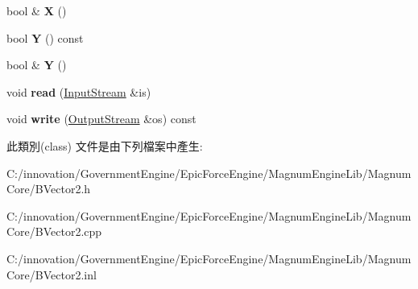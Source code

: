 \begin{DoxyCompactItemize}
\item 
bool \& {\bfseries X} ()\hypertarget{class_i_dream_sky_1_1_b_vector2_aa8c60f47da18379ac304c7e4e9345c1b}{}\label{class_i_dream_sky_1_1_b_vector2_aa8c60f47da18379ac304c7e4e9345c1b}

\item 
bool {\bfseries Y} () const \hypertarget{class_i_dream_sky_1_1_b_vector2_a7cdcf6dcce51f5551c194712821c5e0b}{}\label{class_i_dream_sky_1_1_b_vector2_a7cdcf6dcce51f5551c194712821c5e0b}

\item 
bool \& {\bfseries Y} ()\hypertarget{class_i_dream_sky_1_1_b_vector2_afafb1e23ca8dc85f8ae3ec101d5c86b1}{}\label{class_i_dream_sky_1_1_b_vector2_afafb1e23ca8dc85f8ae3ec101d5c86b1}

\item 
void {\bfseries read} (\hyperlink{class_i_dream_sky_1_1_input_stream}{Input\+Stream} \&is)\hypertarget{class_i_dream_sky_1_1_b_vector2_af55ea5d8704d0456b89d37f2dca28ff1}{}\label{class_i_dream_sky_1_1_b_vector2_af55ea5d8704d0456b89d37f2dca28ff1}

\item 
void {\bfseries write} (\hyperlink{class_i_dream_sky_1_1_output_stream}{Output\+Stream} \&os) const \hypertarget{class_i_dream_sky_1_1_b_vector2_a9c08307da66016196c8d048a8a2fd87a}{}\label{class_i_dream_sky_1_1_b_vector2_a9c08307da66016196c8d048a8a2fd87a}

\end{DoxyCompactItemize}


此類別(class) 文件是由下列檔案中產生\+:\begin{DoxyCompactItemize}
\item 
C\+:/innovation/\+Government\+Engine/\+Epic\+Force\+Engine/\+Magnum\+Engine\+Lib/\+Magnum\+Core/B\+Vector2.\+h\item 
C\+:/innovation/\+Government\+Engine/\+Epic\+Force\+Engine/\+Magnum\+Engine\+Lib/\+Magnum\+Core/B\+Vector2.\+cpp\item 
C\+:/innovation/\+Government\+Engine/\+Epic\+Force\+Engine/\+Magnum\+Engine\+Lib/\+Magnum\+Core/B\+Vector2.\+inl\end{DoxyCompactItemize}
